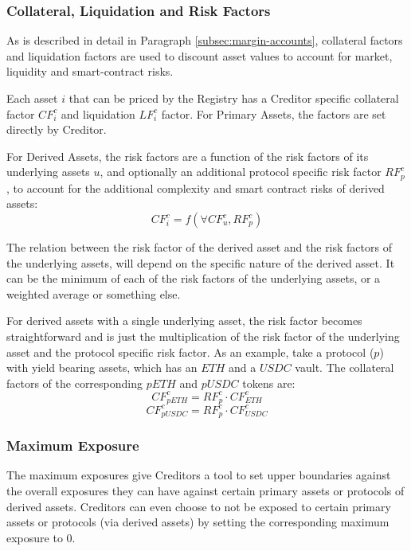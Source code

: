\documentclass[sigconf,nonacm]{acmart}
\begin{document}
\subsubsection{Collateral, Liquidation and Risk Factors}
As is described in detail in Paragraph \ref{subsec:margin-accounts}, collateral factors and liquidation factors are used to discount asset values to account for market, liquidity and smart-contract risks.

Each asset $i$ that can be priced by the Registry has a Creditor specific collateral factor $CF_{i}^{c}$ and liquidation $LF_{i}^{c}$ factor.
For Primary Assets, the factors are set directly by Creditor.

For Derived Assets, the risk factors are a function of the risk factors of its underlying assets $u$, and optionally an additional protocol specific risk factor $RF_{p}^{c}$,
to account for the additional complexity and smart contract risks of derived assets:
\begin{equation}
    CF_{i}^{c} = f(\forall CF_{u}^{c}, RF_{p}^{c})
\end{equation}

The relation between the risk factor of the derived asset and the risk factors of the underlying assets,
will depend on the specific nature of the derived asset.
It can be the minimum of each of the risk factors of the underlying assets, or a weighted average or something else.

For derived assets with a single underlying asset,
the risk factor becomes straightforward and is just the multiplication of the risk factor of the underlying asset and the protocol specific risk factor.
As an example, take a protocol ($p$) with yield bearing assets, which has an $ETH$ and a $USDC$ vault.
The collateral factors of the corresponding $pETH$ and $pUSDC$ tokens are:
\begin{equation}
    CF_{pETH}^{c} = RF_{p}^{c} \cdot CF_{ETH}^{c}
\end{equation}
\begin{equation}
    CF_{pUSDC}^{c} = RF_{p}^{c} \cdot CF_{USDC}^{c}
\end{equation}

\subsubsection{Maximum Exposure}
The maximum exposures give Creditors a tool to set upper boundaries against the overall exposures they can have against certain primary assets or protocols of derived assets.
Creditors can even choose to not be exposed to certain primary assets or protocols (via derived assets) by setting the corresponding maximum exposure to 0.
\end{document}
